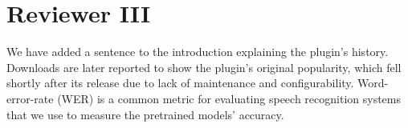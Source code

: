 \documentclass[journal,12pt,onecolumn,draftclsnofoot,]{IEEEtran}
\begin{document}
%
%
%
%
%
%
%


\section{Reviewer III}

%
%
%

We have added a sentence to the introduction explaining the plugin's history. Downloads are later reported to show the plugin's original popularity, which fell shortly after its release due to lack of maintenance and configurability. Word-error-rate (WER) is a common metric for evaluating speech recognition systems that we use to measure the pretrained models' accuracy.
\end{document}
